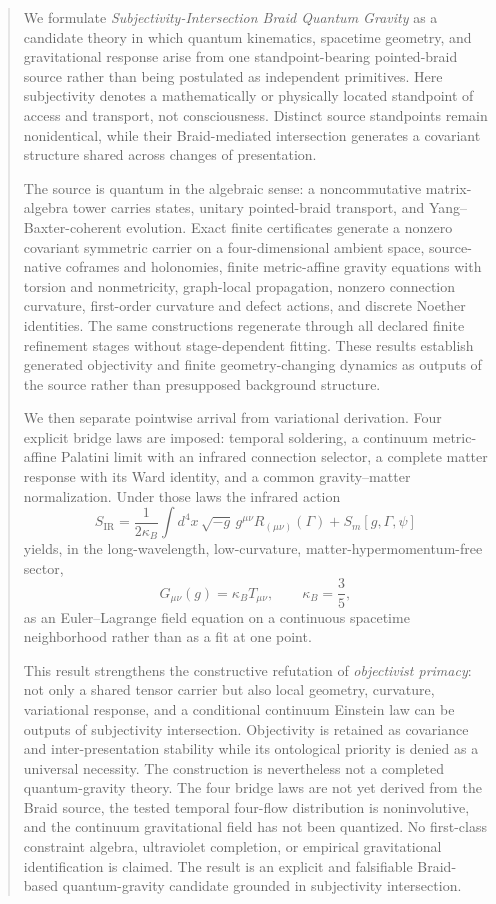 \documentclass[11pt]{article}
\theoremstyle{definition}
\theoremstyle{remark}
\begin{document}
\begin{abstract}
We formulate \emph{Subjectivity-Intersection Braid Quantum Gravity} as a candidate theory in which quantum kinematics, spacetime geometry, and gravitational response arise from one standpoint-bearing pointed-braid source rather than being postulated as independent primitives. Here subjectivity denotes a mathematically or physically located standpoint of access and transport, not consciousness. Distinct source standpoints remain nonidentical, while their Braid-mediated intersection generates a covariant structure shared across changes of presentation.

The source is quantum in the algebraic sense: a noncommutative matrix-algebra tower carries states, unitary pointed-braid transport, and Yang--Baxter-coherent evolution. Exact finite certificates generate a nonzero covariant symmetric carrier on a four-dimensional ambient space, source-native coframes and holonomies, finite metric-affine gravity equations with torsion and nonmetricity, graph-local propagation, nonzero connection curvature, first-order curvature and defect actions, and discrete Noether identities. The same constructions regenerate through all declared finite refinement stages without stage-dependent fitting. These results establish generated objectivity and finite geometry-changing dynamics as outputs of the source rather than presupposed background structure.

We then separate pointwise arrival from variational derivation. Four explicit bridge laws are imposed: temporal soldering, a continuum metric-affine Palatini limit with an infrared connection selector, a complete matter response with its Ward identity, and a common gravity--matter normalization. Under those laws the infrared action
\[
S_{\mathrm{IR}}=\frac{1}{2\kappa_B}\int d^4x\,\sqrt{-g}\,
g^{\mu\nu}R_{(\mu\nu)}(\Gamma)+S_m[g,\Gamma,\psi]
\]
yields, in the long-wavelength, low-curvature, matter-hypermomentum-free sector,
\[
G_{\mu\nu}(g)=\kappa_B T_{\mu\nu},\qquad \kappa_B=\frac35,
\]
as an Euler--Lagrange field equation on a continuous spacetime neighborhood rather than as a fit at one point.

This result strengthens the constructive refutation of \emph{objectivist primacy}: not only a shared tensor carrier but also local geometry, curvature, variational response, and a conditional continuum Einstein law can be outputs of subjectivity intersection. Objectivity is retained as covariance and inter-presentation stability while its ontological priority is denied as a universal necessity. The construction is nevertheless not a completed quantum-gravity theory. The four bridge laws are not yet derived from the Braid source, the tested temporal four-flow distribution is noninvolutive, and the continuum gravitational field has not been quantized. No first-class constraint algebra, ultraviolet completion, or empirical gravitational identification is claimed. The result is an explicit and falsifiable Braid-based quantum-gravity candidate grounded in subjectivity intersection.
\end{abstract}
\end{document}
